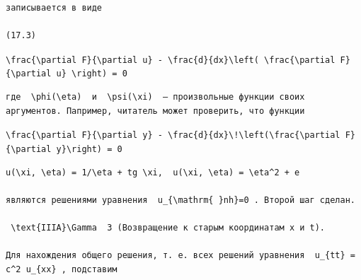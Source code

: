 \documentclass[
  ukrainian,
]{article}
\begin{document}
\begin{verbatim}
записывается в виде

(17.3)
\end{verbatim}

\texttt{\textbackslash{}frac\{\textbackslash{}partial\ F\}\{\textbackslash{}partial\ u\}\ -\ \textbackslash{}frac\{d\}\{dx\}\textbackslash{}left(\ \textbackslash{}frac\{\textbackslash{}partial\ F\}\{\textbackslash{}partial\ u\textquotesingle{}\}\ \textbackslash{}right)\ =\ 0}

\begin{verbatim}
где  \phi(\eta)  и  \psi(\xi)  — произвольные функции своих аргументов. Папример, читатель может проверить, что функции
\end{verbatim}

\texttt{\textbackslash{}frac\{\textbackslash{}partial\ F\}\{\textbackslash{}partial\ y\}\ -\ \textbackslash{}frac\{d\}\{dx\}\textbackslash{}!\textbackslash{}left(\textbackslash{}frac\{\textbackslash{}partial\ F\}\{\textbackslash{}partial\ y\textquotesingle{}\}\textbackslash{}right)\ =\ 0}

\begin{verbatim}
u(\xi, \eta) = 1/\eta + tg \xi,  u(\xi, \eta) = \eta^2 + e 

являются решениями уравнения  u_{\mathrm{ }nh}=0 . Второй шаг сделан.

 \text{IIIA}\Gamma  3 (Возвращение к старым координатам x и t).

Для нахождения общего решения, т. е. всех решений уравнения  u_{tt} = c^2 u_{xx} , подставим
\end{verbatim}
\end{document}
